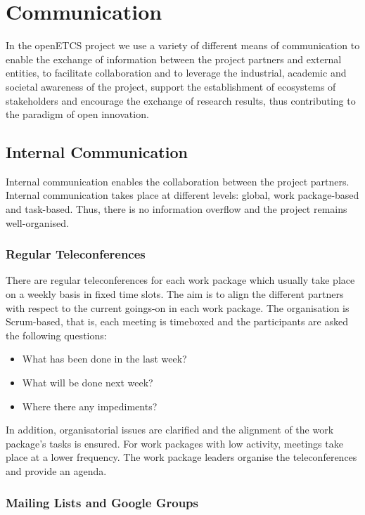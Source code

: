 ﻿\section{Communication}\label{sct:communication}
In the openETCS project we use a variety of different means of communication to enable the exchange of information between the project partners and external entities, to facilitate collaboration and to leverage the industrial, academic and societal awareness of the project, support the establishment of ecosystems of stakeholders and encourage the exchange of research results, thus contributing to the paradigm of open innovation.

\subsection{Internal Communication}

Internal communication enables the collaboration between the project partners. Internal communication takes place at different levels: global, work package-based and task-based. Thus, there is no information overflow and the project remains well-organised.

\subsubsection{Regular Teleconferences}

There are regular teleconferences for each work package which usually take place on a weekly basis in fixed time slots. The aim is to align the different partners with respect to the current goings-on in each work package. The organisation is Scrum-based, that is, each meeting is timeboxed and the participants are asked the following questions:
\begin{itemize}
\item What has been done in the last week?
\item What will be done next week?
\item Where there any impediments?
\end{itemize}

In addition, organisatorial issues are clarified and the alignment of the work package's tasks is ensured. For work packages with low activity, meetings take place at a lower frequency. The work package leaders organise the teleconferences and provide an agenda.

\subsubsection{Mailing Lists and Google Groups}

